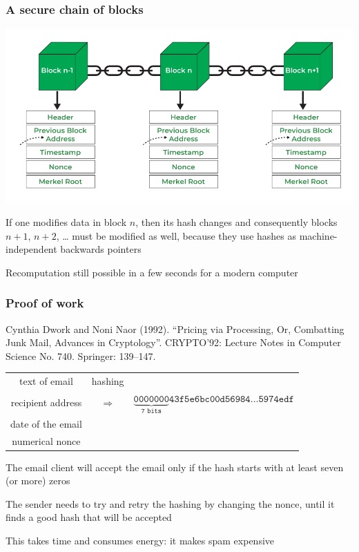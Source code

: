 \documentclass[11pt]{beamer}  %
\begin{document}
\begin{frame}\frametitle{A secure chain of blocks}

  \begin{center}
    \includegraphics[scale=0.26,clip=false]{pictures/blocks.png}
  \end{center}

  If one modifies data in block $n$, then its hash changes and consequently
  blocks $n+1$, $n+2$, \ldots
  must be modified as well, because they use hashes as machine-independent backwards pointers

  \medskip

  \begin{redbox}{}
    Recomputation still possible in a few seconds for a modern computer
  \end{redbox}
  
\end{frame}

\begin{frame}\frametitle{Proof of work}

  \begin{redbox}{}
    Cynthia Dwork and Noni Naor (1992). “Pricing via Processing, Or, Combatting Junk Mail, Advances in Cryptology”. CRYPTO’92: Lecture Notes in Computer Science No. 740. Springer: 139–147.
  \end{redbox}

  \bigskip

  \begin{tabular}{ccc}
    text of email & hashing & \\
    recipient address & $\Rightarrow$ & $\mathtt{\underbrace{0000000}_{7\text{ bits}}43f5e6bc00d56984\ldots5974edf}$\\
    date of the email && \\
    numerical nonce &&
  \end{tabular}

  \bigskip

  The email client will accept the email only if the hash starts with at least seven (or more) zeros

  \bigskip

  The sender needs to try and retry the hashing by changing the nonce, until it finds a good hash that will be accepted

  \bigskip

  This takes time and consumes energy: it makes spam expensive

\end{frame}
\end{document}
